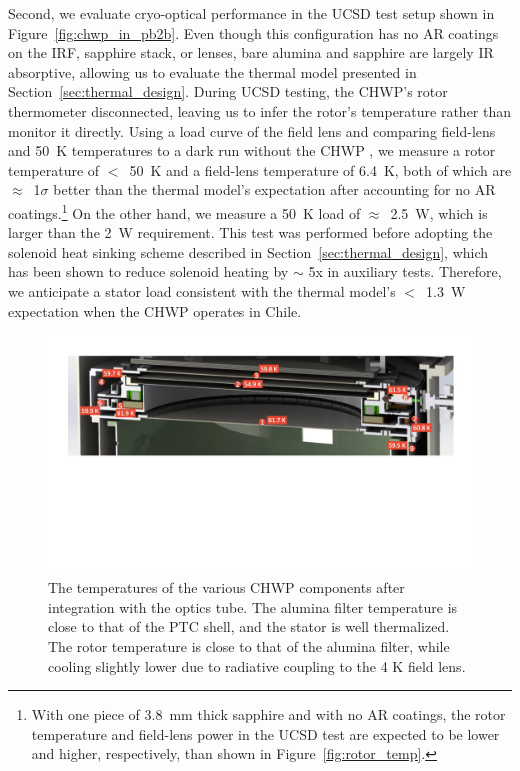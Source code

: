 Second, we evaluate cryo-optical performance in the UCSD test setup shown in Figure~\ref{fig:chwp_in_pb2b}. Even though this configuration has no AR coatings on the IRF, sapphire stack, or lenses, bare alumina and sapphire are largely IR absorptive, allowing us to evaluate the thermal model presented in Section~\ref{sec:thermal_design}. During UCSD testing, the CHWP's rotor thermometer disconnected, leaving us to infer the rotor's temperature rather than monitor it directly. Using a load curve of the field lens \cite{howe_polarbear-2_2019} and comparing field-lens and 50~K temperatures to a dark run without the CHWP \cite{howe_polarbear-2_2019}, we measure a rotor temperature of $<$~50~K and a field-lens temperature of 6.4~K, both of which are $\approx$~1$\sigma$ better than the thermal model's expectation after accounting for no AR coatings.\footnote{With one piece of 3.8~mm thick sapphire and with no AR coatings, the rotor temperature and field-lens power in the UCSD test are expected to be lower and higher, respectively, than shown in Figure~\ref{fig:rotor_temp}.} On the other hand, we measure a 50~K load of $\approx$~2.5~W, which is larger than the 2~W requirement. This test was performed before adopting the solenoid heat sinking scheme described in Section~\ref{sec:thermal_design}, which has been shown to reduce solenoid heating by $\sim$ 5x in auxiliary tests. Therefore, we anticipate a stator load consistent with the thermal model's $<$~1.3~W expectation when the CHWP operates in Chile.

\begin{figure}[!t]
    \centering
    \includegraphics[width=0.98\linewidth, trim=2cm 9cm 2cm 0cm, clip]{CHWPEvaluation/Figures/chwp_temperatures.jpg}
    \caption[CHWP temperatures]{The temperatures of the various CHWP components after integration with the optics tube. The alumina filter temperature is close to that of the PTC shell, and the stator is well thermalized. The rotor temperature is close to that of the alumina filter, while cooling slightly lower due to radiative coupling to the 4 K field lens.}
    \label{fig:chwp_temperatures}
\end{figure}

